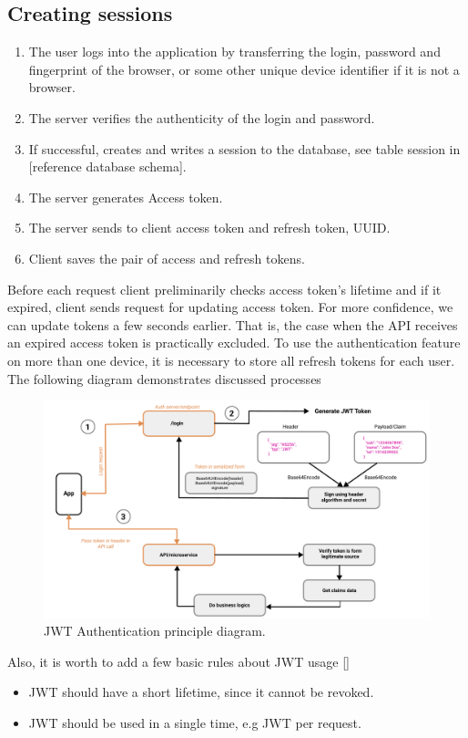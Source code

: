 \subsection{Creating sessions}\label{subsec:creating-sessions}

\begin{enumerate}
    \item The user logs into the application by transferring the login, password and fingerprint of the browser,
    or some other unique device identifier if it is not a browser.
    \item The server verifies the authenticity of the login and password.
    \item If successful, creates and writes a session to the database, see table session in [reference database schema].
    \item The server generates Access token.
    \item The server sends to client access token and refresh token, UUID\@.
    \item Client saves the pair of access and refresh tokens.
\end{enumerate}

Before each request client preliminarily checks access token's lifetime and if it expired, client sends request for
updating access token.
For more confidence, we can update tokens a few seconds earlier.
That is, the case when the API receives an expired access token is practically excluded.
To use the authentication feature on more than one device, it is necessary to store all refresh tokens for each user.
The following diagram demonstrates discussed processes

\begin{figure}[H]
    \centering
    \includegraphics[width=1\textwidth]{Pictures/jwt_auth_scheme.pdf}
    \caption{JWT Authentication principle diagram.}\label{fig:figure3}
\end{figure}

Also, it is worth to add a few basic rules about JWT usage [\cite{RDegges}]
\begin{itemize}
    \item JWT should have a short lifetime, since it cannot be revoked.
    \item JWT should be used in a single time, e.g JWT per request.
\end{itemize}